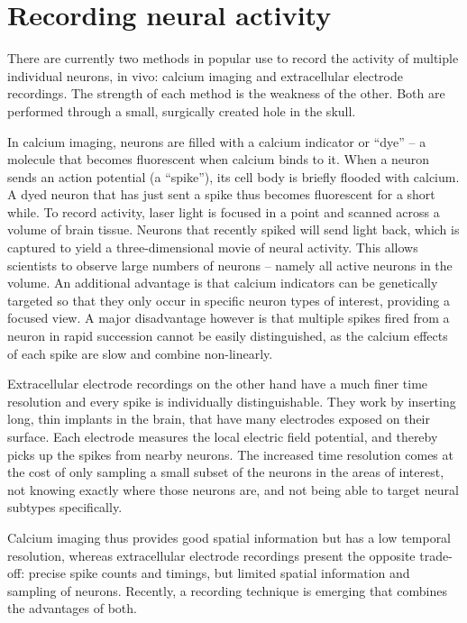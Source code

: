 \section{Recording neural activity}

There are currently two methods in popular use to record the activity of multiple individual neurons, in vivo: calcium imaging and extracellular electrode recordings.\cite{Carter2015GuideResearchTechniques,Scanziani2009ElectrophysiologyAgeLight}
The strength of each method is the weakness of the other. Both are performed through a small, surgically created hole in the skull.

In calcium imaging, neurons are filled with a calcium indicator or “dye” – a molecule that becomes fluorescent when calcium binds to it. When a neuron sends an action potential (a “spike”), its cell body is briefly flooded with calcium. A dyed neuron that has just sent a spike thus becomes fluorescent for a short while. To record activity, laser light is focused in a point and scanned across a volume of brain tissue. Neurons that recently spiked will send light back, which is captured to yield a three-dimensional movie of neural activity. This allows scientists to observe large numbers of neurons – namely all active neurons in the volume. An additional advantage is that calcium indicators can be genetically targeted so that they only occur in specific neuron types of interest, providing a focused view. A major disadvantage however is that multiple spikes fired from a neuron in rapid succession cannot be easily distinguished, as the calcium effects of each spike are slow and combine non-linearly.

Extracellular electrode recordings on the other hand have a much finer time resolution and every spike is individually distinguishable. They work by inserting long, thin implants in the brain, that have many electrodes exposed on their surface. Each electrode measures the local electric field potential, and thereby picks up the spikes from nearby neurons. The increased time resolution comes at the cost of only sampling a small subset of the neurons in the areas of interest, not knowing exactly where those neurons are, and not being able to target neural subtypes specifically.

Calcium imaging thus provides good spatial information but has a low temporal resolution, whereas extracellular electrode recordings present the opposite trade-off: precise spike counts and timings, but limited spatial information and sampling of neurons. Recently, a recording technique is emerging that combines the advantages of both.


